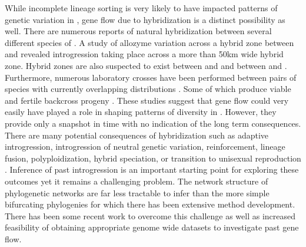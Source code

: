 While incomplete lineage sorting is very likely to have impacted patterns of genetic  
variation in \anaxyrus, gene flow due to hybridization is a distinct possibility as well.
There are numerous reports of natural hybridization between several different 
species of \anaxyrus \parencite{green1996}. 
A study of allozyme variation across a hybrid zone between \amer and 
\hemiophrys revealed introgression taking place across a more than 50km wide hybrid zone.
Hybrid zones are also suspected to exist between \amer and \terr
and between \wood and \fowl \parencite{green1996,weatherby1982}.
Furthermore, numerous laboratory crosses have been performed between pairs of \anaxyrus 
species with currently overlapping distributions \parencite{blair1972,blair1963}.
Some of which produce viable and fertile backcross progeny \parencite{blair1972,blair1963}.
These studies suggest that gene flow could very easily have played a role in shaping patterns
of diversity in \anaxyrus. 
However, they provide only a snapshot in time with no indication of the long term 
consequences.
There are many potential consequences of hybridization such as adaptive introgression, 
introgression of neutral genetic variation, reinforcement, lineage fusion, 
polyploidization, hybrid speciation, or transition to unisexual reproduction \parencite{abbott2013}. 
Inference of past introgression is an important starting point for exploring these
outcomes yet it remains a challenging problem. 
The network structure of phylogenetic networks are far less tractable to infer than the 
more simple bifurcating phylogenies for which there has been extensive method development.
There has been some recent work to overcome this challenge as well as increased 
feasibility of obtaining appropriate genome wide datasets to investigate past 
gene flow.


